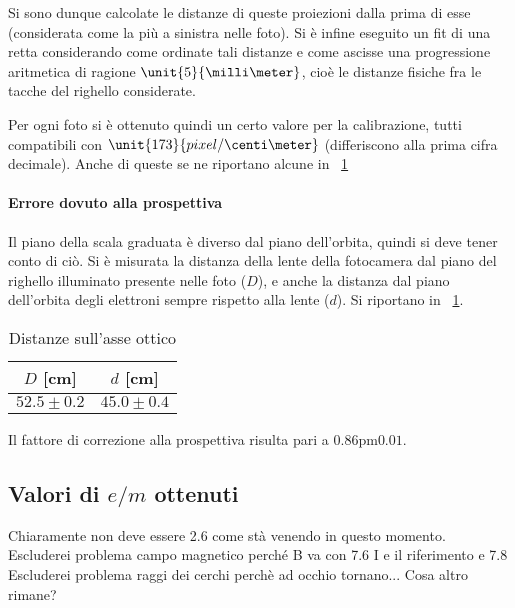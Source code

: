 \documentclass[10pt,a4paper]{article}
\begin{document}
Si sono dunque calcolate le distanze di queste proiezioni dalla prima di esse (considerata come la più a sinistra nelle foto). Si è infine eseguito un fit di una retta considerando come ordinate tali distanze e come ascisse una progressione aritmetica di ragione $\unit{5}{\milli\meter}$, cioè le distanze fisiche fra le tacche del righello considerate.

Per ogni foto si è ottenuto quindi un certo valore per la calibrazione, tutti compatibili con  $\unit{173}{pixel / \centi\meter}$ (differiscono alla prima cifra decimale). Anche di queste se ne riportano alcune in \tablename{~\ref{tab:somecal}}

\begin{figure}[H]
	\centering
	\resizebox{0.3\textwidth}{!}{
		}
	\label{tab:somecal}
\end{figure}


\paragraph{Errore dovuto alla prospettiva} Il piano della scala graduata è diverso dal piano dell'orbita, quindi si deve tener conto di ciò. Si è misurata la distanza della lente della fotocamera dal piano del righello illuminato presente nelle foto ($D$), e anche la distanza dal piano dell'orbita degli elettroni sempre rispetto alla lente ($d$).
Si riportano in \tablename{~\ref{tab:dist}}.
\begin{table}[H]
	\centering
	\begin{tabular}{c|c}
		$D$ [cm] & $d$ [cm]\\
		\hline
		$52.5 \pm 0.2$ & $45.0 \pm 0.4$\\
	\end{tabular}
	\caption{Distanze sull'asse ottico}
	\label{tab:dist}
\end{table}

Il fattore di correzione alla prospettiva risulta pari a $\unit{0.86 \pm 0.01}{}$.

\subsection{Valori di $e/m$ ottenuti}
Chiaramente non deve essere 2.6 come stà venendo in questo momento.
Escluderei problema campo magnetico perché B va con 7.6 I e il riferimento e 7.8
Escluderei problema raggi dei cerchi perchè ad occhio tornano...
Cosa altro rimane? 
\end{document}

